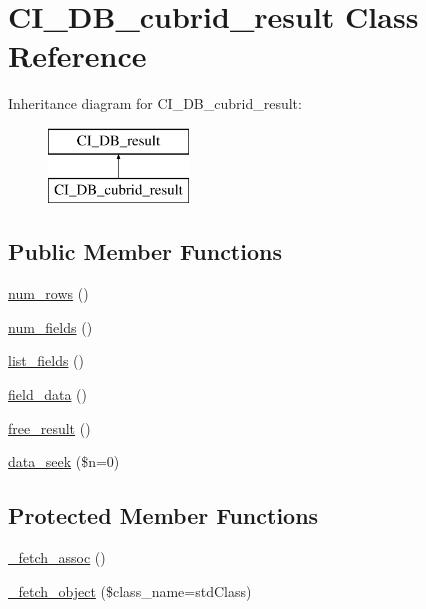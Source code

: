 \hypertarget{class_c_i___d_b__cubrid__result}{}\section{C\+I\+\_\+\+D\+B\+\_\+cubrid\+\_\+result Class Reference}
\label{class_c_i___d_b__cubrid__result}
Inheritance diagram for C\+I\+\_\+\+D\+B\+\_\+cubrid\+\_\+result\+:\begin{figure}[H]
\begin{center}
\leavevmode
\includegraphics[height=2.000000cm]{class_c_i___d_b__cubrid__result}
\end{center}
\end{figure}
\subsection*{Public Member Functions}
\begin{DoxyCompactItemize}
\item 
\mbox{\hyperlink{class_c_i___d_b__cubrid__result_a24234b006b5f5f551db67f8799b1660e}{num\+\_\+rows}} ()
\item 
\mbox{\hyperlink{class_c_i___d_b__cubrid__result_a63b5eda61a6a3d500be221dd6c50fbf7}{num\+\_\+fields}} ()
\item 
\mbox{\hyperlink{class_c_i___d_b__cubrid__result_addd6d51ab6a84bf73e08dadfedba1b56}{list\+\_\+fields}} ()
\item 
\mbox{\hyperlink{class_c_i___d_b__cubrid__result_a7c4b45c7dcad51ac34ac6ffdff916516}{field\+\_\+data}} ()
\item 
\mbox{\hyperlink{class_c_i___d_b__cubrid__result_a7a1b1c576cec1ec814484ae4a71a051b}{free\+\_\+result}} ()
\item 
\mbox{\hyperlink{class_c_i___d_b__cubrid__result_a31f6ba3ccb3de8e6c3a8c07a40805aaa}{data\+\_\+seek}} (\$n=0)
\end{DoxyCompactItemize}
\subsection*{Protected Member Functions}
\begin{DoxyCompactItemize}
\item 
\mbox{\hyperlink{class_c_i___d_b__cubrid__result_a200ad80b2fd287a6386b509e7f22a55c}{\+\_\+fetch\+\_\+assoc}} ()
\item 
\mbox{\hyperlink{class_c_i___d_b__cubrid__result_a304d17431e06513a65ad64c5f1c3a706}{\+\_\+fetch\+\_\+object}} (\$class\+\_\+name=\textquotesingle{}std\+Class\textquotesingle{})
\end{DoxyCompactItemize}
